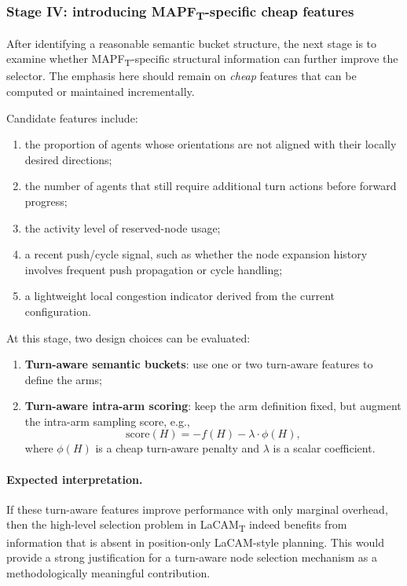 \documentclass[lettersize,journal]{IEEEtran}
\begin{document}
\subsubsection{Stage IV: introducing MAPF\textsubscript{T}-specific cheap features}
\label{subsec:stage4_turn_features}

After identifying a reasonable semantic bucket structure, the next stage is to examine whether MAPF\textsubscript{T}-specific structural information can further improve the selector. The emphasis here should remain on \emph{cheap} features that can be computed or maintained incrementally.

Candidate features include:
\begin{enumerate}[(1)]
    \item the proportion of agents whose orientations are not aligned with their locally desired directions;
    \item the number of agents that still require additional turn actions before forward progress;
    \item the activity level of reserved-node usage;
    \item a recent push/cycle signal, such as whether the node expansion history involves frequent push propagation or cycle handling;
    \item a lightweight local congestion indicator derived from the current configuration.
\end{enumerate}

At this stage, two design choices can be evaluated:
\begin{enumerate}[(1)]
    \item \textbf{Turn-aware semantic buckets}: use one or two turn-aware features to define the arms;
    \item \textbf{Turn-aware intra-arm scoring}: keep the arm definition fixed, but augment the intra-arm sampling score, e.g.,
    \[
    \text{score}(H) = -f(H) - \lambda \cdot \phi(H),
    \]
    where $\phi(H)$ is a cheap turn-aware penalty and $\lambda$ is a scalar coefficient.
\end{enumerate}

\paragraph{Expected interpretation.}
If these turn-aware features improve performance with only marginal overhead, then the high-level selection problem in LaCAM\textsubscript{T} indeed benefits from information that is absent in position-only LaCAM-style planning. This would provide a strong justification for a turn-aware node selection mechanism as a methodologically meaningful contribution.
\end{document}
